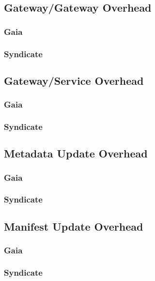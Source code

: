 \subsection{Gateway/Gateway Overhead}

\subsubsection{Gaia}

\subsubsection{Syndicate}

\subsection{Gateway/Service Overhead}

\subsubsection{Gaia}

\subsubsection{Syndicate}

\subsection{Metadata Update Overhead}

\subsubsection{Gaia}

\subsubsection{Syndicate}

\subsection{Manifest Update Overhead}

\subsubsection{Gaia}

\subsubsection{Syndicate}

